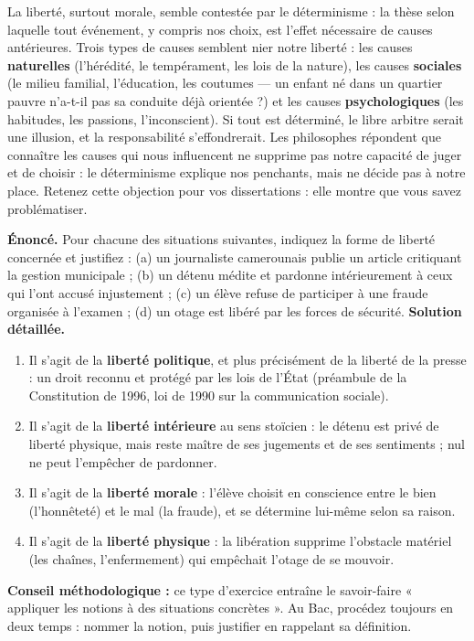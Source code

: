 \documentclass[11pt]{article}
\newcommand{\cle}[1]{{\popxbold\color{popdark}#1}}
\newcounter{popsec}
\newcounter{popsub}
\newcommand{\courssub}[1]{%
  \stepcounter{popsub}%
  \par\vspace{9pt}\noindent{\popxbold\fontsize{11.5}{13}\selectfont\color{popink}{\color{poporange}\thepopsec.\thepopsub}\hspace{6pt}#1}\par\nopagebreak\vspace{4pt}
}
\begin{document}
\courssub{Complément Bac : la question du déterminisme}

\begin{attention}
La liberté, surtout morale, semble contestée par le \cle{déterminisme} : la thèse selon laquelle tout événement, y compris nos choix, est l'effet nécessaire de causes antérieures. Trois types de causes semblent nier notre liberté : les causes \textbf{naturelles} (l'hérédité, le tempérament, les lois de la nature), les causes \textbf{sociales} (le milieu familial, l'éducation, les coutumes — un enfant né dans un quartier pauvre n'a-t-il pas sa conduite déjà orientée ?) et les causes \textbf{psychologiques} (les habitudes, les passions, l'inconscient). Si tout est déterminé, le libre arbitre serait une illusion, et la responsabilité s'effondrerait. Les philosophes répondent que connaître les causes qui nous influencent ne supprime pas notre capacité de juger et de choisir : le déterminisme explique nos penchants, mais ne décide pas à notre place. Retenez cette objection pour vos dissertations : elle montre que vous savez problématiser.
\end{attention}

\begin{exoresolu}
\textbf{Énoncé.} Pour chacune des situations suivantes, indiquez la forme de liberté concernée et justifiez : (a) un journaliste camerounais publie un article critiquant la gestion municipale ; (b) un détenu médite et pardonne intérieurement à ceux qui l'ont accusé injustement ; (c) un élève refuse de participer à une fraude organisée à l'examen ; (d) un otage est libéré par les forces de sécurité.
\tcblower
\textbf{Solution détaillée.}
\begin{enumerate}
\item[(a)] Il s'agit de la \textbf{liberté politique}, et plus précisément de la liberté de la presse : un droit reconnu et protégé par les lois de l'État (préambule de la Constitution de 1996, loi de 1990 sur la communication sociale).
\item[(b)] Il s'agit de la \textbf{liberté intérieure} au sens stoïcien : le détenu est privé de liberté physique, mais reste maître de ses jugements et de ses sentiments ; nul ne peut l'empêcher de pardonner.
\item[(c)] Il s'agit de la \textbf{liberté morale} : l'élève choisit en conscience entre le bien (l'honnêteté) et le mal (la fraude), et se détermine lui-même selon sa raison.
\item[(d)] Il s'agit de la \textbf{liberté physique} : la libération supprime l'obstacle matériel (les chaînes, l'enfermement) qui empêchait l'otage de se mouvoir.
\end{enumerate}
\textbf{Conseil méthodologique :} ce type d'exercice entraîne le savoir-faire « appliquer les notions à des situations concrètes ». Au Bac, procédez toujours en deux temps : nommer la notion, puis justifier en rappelant sa définition.
\end{exoresolu}
\end{document}
